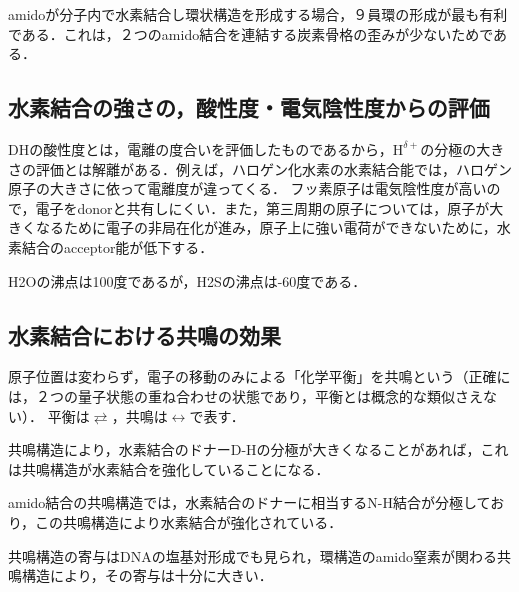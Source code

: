 \documentclass[uplatex, dvipdfmx]{jsreport}
\begin{document}
\begin{example}
    amidoが分子内で水素結合し環状構造を形成する場合，９員環の形成が最も有利である．これは，２つのamido結合を連結する炭素骨格の歪みが少ないためである．
    \begin{center}
    \end{center}
\end{example}

\subsection{水素結合の強さの，酸性度・電気陰性度からの評価}

DHの酸性度とは，電離の度合いを評価したものであるから，$\mathrm{H}^{\delta+}$の分極の大きさの評価とは解離がある．例えば，ハロゲン化水素の水素結合能では，ハロゲン原子の大きさに依って電離度が違ってくる．
フッ素原子は電気陰性度が高いので，電子をdonorと共有しにくい．また，第三周期の原子については，原子が大きくなるために電子の非局在化が進み，原子上に強い電荷ができないために，水素結合のacceptor能が低下する．
\begin{example}
    H2Oの沸点は100度であるが，H2Sの沸点は-60度である．
\end{example}

\subsection{水素結合における共鳴の効果}

\begin{definition}[resonance]
    原子位置は変わらず，電子の移動のみによる「化学平衡」を共鳴という（正確には，２つの量子状態の重ね合わせの状態であり，平衡とは概念的な類似さえない）．
    平衡は$\rightleftarrows$，共鳴は$\leftrightarrow$で表す．
\end{definition}
共鳴構造により，水素結合のドナーD-Hの分極が大きくなることがあれば，これは共鳴構造が水素結合を強化していることになる．
\begin{fact}
    amido結合の共鳴構造では，水素結合のドナーに相当するN-H結合が分極しており，この共鳴構造により水素結合が強化されている．
\end{fact}
\begin{example}[DNAの塩基対への共鳴構造の寄与]
    共鳴構造の寄与はDNAの塩基対形成でも見られ，環構造のamido窒素が関わる共鳴構造により，その寄与は十分に大きい．
\end{example}
\end{document}
